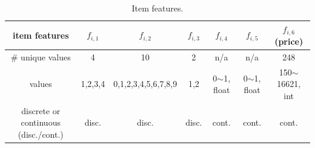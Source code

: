 \begin{table}[t!]
    \centering
    \caption{Item features.}
    \begin{tabular}{c|c|c|c|c|c|c}
    \hline
    { \textbf{item features}} & { $f_{i,1}$} & 
    { $f_{i,2}$} & 
    { $f_{i,3}$} & 
    { $f_{i,4}$} & 
    { $f_{i,5}$} & 
    { $f_{i,6}$ (price)} \\ \hline
    {\# unique values} & {4} & {10} & {2} & {n/a} & {n/a} & {248} \\ \hline
    {values} & {1,2,3,4} & {0,1,2,3,4,5,6,7,8,9} & {1,2} & { 0$\sim$1, float} & {0$\sim$1, float} & {150$\sim$16621, int} \\ \hline
    discrete or continuous (disc./cont.) & disc. & disc. & disc. & cont. & cont. & cont. \\ \hline
    \end{tabular}
    \label{tab:item_features}
\end{table}



